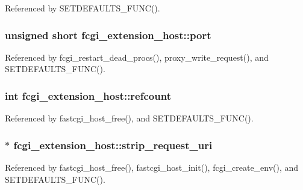 Referenced by S\-E\-T\-D\-E\-F\-A\-U\-L\-T\-S\-\_\-\-F\-U\-N\-C().

\hypertarget{structfcgi__extension__host_ad41957f0ebf10f9066e84a02ecd269f8}{
\subsubsection[{port}]{\setlength{\rightskip}{0pt plus 5cm}unsigned short fcgi\-\_\-extension\-\_\-host\-::port}}\label{structfcgi__extension__host_ad41957f0ebf10f9066e84a02ecd269f8}


Referenced by fcgi\-\_\-restart\-\_\-dead\-\_\-procs(), proxy\-\_\-write\-\_\-request(), and S\-E\-T\-D\-E\-F\-A\-U\-L\-T\-S\-\_\-\-F\-U\-N\-C().

\hypertarget{structfcgi__extension__host_a8a7d3cb5d5c201760bb5da036126ffd1}{
\subsubsection[{refcount}]{\setlength{\rightskip}{0pt plus 5cm}int fcgi\-\_\-extension\-\_\-host\-::refcount}}\label{structfcgi__extension__host_a8a7d3cb5d5c201760bb5da036126ffd1}


Referenced by fastcgi\-\_\-host\-\_\-free(), and S\-E\-T\-D\-E\-F\-A\-U\-L\-T\-S\-\_\-\-F\-U\-N\-C().

\hypertarget{structfcgi__extension__host_aa593d8c96001f747795610eca69cc646}{
\subsubsection[{strip\-\_\-request\-\_\-uri}]{$\ast$ fcgi\-\_\-extension\-\_\-host\-::strip\-\_\-request\-\_\-uri}}\label{structfcgi__extension__host_aa593d8c96001f747795610eca69cc646}


Referenced by fastcgi\-\_\-host\-\_\-free(), fastcgi\-\_\-host\-\_\-init(), fcgi\-\_\-create\-\_\-env(), and S\-E\-T\-D\-E\-F\-A\-U\-L\-T\-S\-\_\-\-F\-U\-N\-C().

